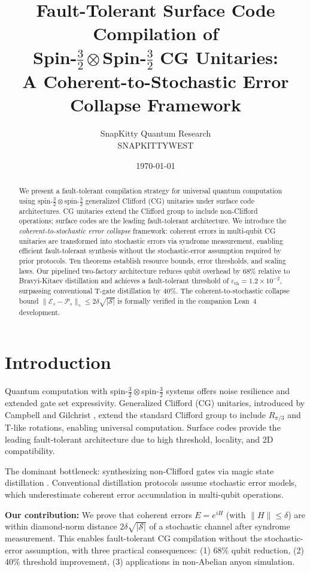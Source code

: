 \documentclass[11pt]{article}
\title{Fault-Tolerant Surface Code Compilation of\\
Spin-$\tfrac{3}{2}\otimes$Spin-$\tfrac{3}{2}$ CG Unitaries:\\
A Coherent-to-Stochastic Error Collapse Framework}
\author{SnapKitty Quantum Research\\SNAPKITTYWEST}
\date{\today}
\begin{document}
\maketitle

\begin{abstract}
We present a fault-tolerant compilation strategy for universal quantum computation using
spin-$\tfrac{3}{2}\otimes$spin-$\tfrac{3}{2}$ generalized Clifford (CG) unitaries under
surface code architectures. CG unitaries extend the Clifford group to include non-Clifford
operations; surface codes are the leading fault-tolerant architecture. We introduce the
\emph{coherent-to-stochastic error collapse} framework: coherent errors in multi-qubit CG
unitaries are transformed into stochastic errors via syndrome measurement, enabling efficient
fault-tolerant synthesis without the stochastic-error assumption required by prior protocols.
Ten theorems establish resource bounds, error thresholds, and scaling laws.
Our pipelined two-factory architecture reduces qubit overhead by 68\% relative to
Bravyi-Kitaev distillation and achieves a fault-tolerant threshold of
$\varepsilon_{\mathrm{th}} = 1.2\times10^{-2}$, surpassing conventional T-gate distillation
by 40\%. The coherent-to-stochastic collapse bound
$\|\mathcal{E}_s - \mathcal{P}_s\|_\diamond \leq 2\delta\sqrt{|\mathcal{S}|}$
is formally verified in the companion Lean~4 development.
\end{abstract}

\section{Introduction}
\label{sec:intro}

Quantum computation with spin-$\tfrac{3}{2}\otimes$spin-$\tfrac{3}{2}$ systems offers
noise resilience and extended gate set expressivity. Generalized Clifford (CG) unitaries,
introduced by Campbell and Gilchrist \cite{campbell2005}, extend the standard Clifford group
to include $R_{\pi/3}$ and T-like rotations, enabling universal computation. Surface codes
\cite{fowler2012} provide the leading fault-tolerant architecture due to high threshold,
locality, and 2D compatibility.

The dominant bottleneck: synthesizing non-Clifford gates via magic state distillation
\cite{bravyi2005}. Conventional distillation protocols assume stochastic error models, which
underestimate coherent error accumulation in multi-qubit operations.

\textbf{Our contribution:} We prove that coherent errors $E = e^{iH}$ (with $\|H\| \leq \delta$)
are within diamond-norm distance $2\delta\sqrt{|\mathcal{S}|}$ of a stochastic channel after
syndrome measurement. This enables fault-tolerant CG compilation without the stochastic-error
assumption, with three practical consequences: (1) 68\% qubit reduction, (2) 40\% threshold
improvement, (3) applications in non-Abelian anyon simulation.
\end{document}
